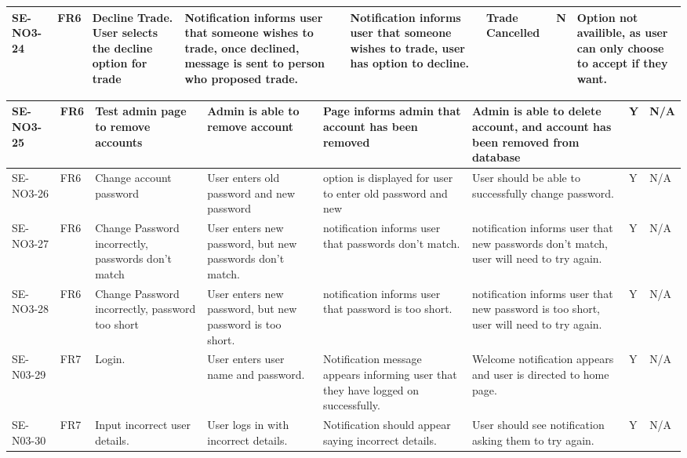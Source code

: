 \documentclass[a4paper]{article}
\begin{document}
\begin{landscape}
\begin{center}
\begin{tabular}{| l | l | p{3cm} | p{3cm} | p{4cm} | p{4cm} |p{1cm} |p{3cm} |}
\hline
	SE-NO3-24 & FR6 & Decline Trade. User selects the decline option for trade & Notification informs user that someone wishes to trade, once declined, message is sent to person who proposed trade. & Notification informs user that someone wishes to trade, user has option to decline.& Trade Cancelled & N & Option not availible, as user can only choose to accept if they want.\\
\hline

\end{tabular}
\end{center}

\clearpage

\begin{center}
\thispagestyle{empty}

	\begin{tabular}{| l | l | p{3cm} | p{3cm} | p{4cm} | p{4cm} |p{1cm} |p{3cm} |}
\hline
	SE-NO3-25 & FR6 & Test admin page to remove accounts & Admin is able to remove account & Page informs admin that account has been removed & Admin is able to delete account, and account has been removed from database & Y & N/A\\
\hline
	SE-NO3-26 & FR6 & Change account password & User enters old password and new password & option is displayed for user to enter old password and new & User should be able to successfully change password. & Y & N/A\\
\hline
	SE-NO3-27 & FR6 &  Change Password incorrectly, passwords don't match & User enters new password, but new passwords don't match. & notification informs user that passwords don't match. & notification informs user that new passwords don't match, user will need to try again. & Y & N/A\\
\hline
	SE-NO3-28 & FR6 & Change Password incorrectly, password too short & User enters new password, but new password is too short. & notification informs user that password is too short. & notification informs user that new password is too short, user will need to try again. & Y & N/A\\
\hline
	SE-N03-29 & FR7 & Login. &  User enters user name and password. & Notification message appears informing user that they have logged on successfully. & Welcome notification appears and user is directed to home page.& Y & N/A \\
\hline
	SE-N03-30 & FR7 & Input incorrect user details. & User logs in with incorrect details. & Notification should appear saying incorrect details. & User should see notification asking them to try again. & Y & N/A\\

\end{tabular}
\end{center}
\end{landscape}
\end{document}
